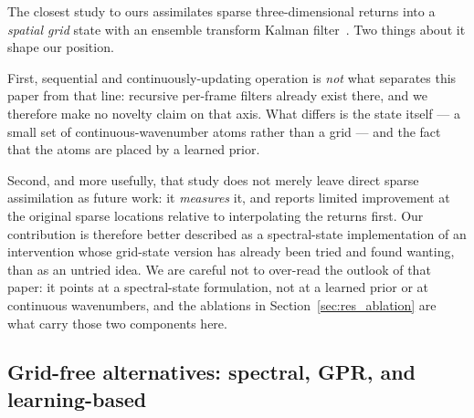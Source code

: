 \documentclass[review]{elsarticle}
\begin{document}
The closest study to ours assimilates sparse three-dimensional returns into a
\emph{spatial grid} state with an ensemble transform Kalman
filter~\cite{Wang2025PointsToWaves}. Two things about it shape our position.

First, sequential and continuously-updating operation is \emph{not} what separates
this paper from that line: recursive per-frame filters already exist there, and we
therefore make no novelty claim on that axis. What differs is the state itself ---
a small set of continuous-wavenumber atoms rather than a grid --- and the fact that
the atoms are placed by a learned prior.

Second, and more usefully, that study does not merely leave direct sparse
assimilation as future work: it \emph{measures} it, and reports limited improvement
at the original sparse locations relative to interpolating the returns first. Our
contribution is therefore better described as a spectral-state implementation of an
intervention whose grid-state version has already been tried and found wanting, than
as an untried idea. We are careful not to over-read the outlook of that paper: it
points at a spectral-state formulation, not at a learned prior or at continuous
wavenumbers, and the ablations in Section~\ref{sec:res_ablation} are what carry those
two components here.

\subsection{Grid-free alternatives: spectral, GPR, and learning-based}
\end{document}
